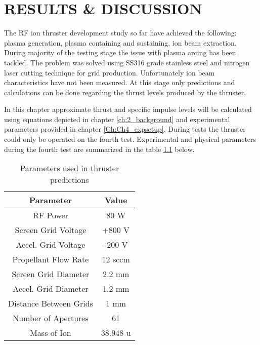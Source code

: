 \chapter{RESULTS \& DISCUSSION}\label{Ch5}

The RF ion thruster development study so far have achieved the following: plasma generation, plasma containing and sustaining, ion beam extraction. During majority of the testing stage the issue with plasma arcing has been tackled. The problem was solved using SS316 grade stainless steel and nitrogen laser cutting technique for grid production. Unfortunately ion beam characteristics have not been measured. At this stage only predictions and calculations can be done regarding the thrust levels produced by the thruster. 

In this chapter approximate thrust and specific impulse levels will be calculated using equations depicted in chapter \ref{ch:2_background} and experimental parameters provided in chapter \ref{Ch:Ch4_expsetup}. During tests the thruster could only be operated on the fourth test. Experimental and physical parameters during the fourth test are summarized in the table \ref{table:predictionparams} below.

\begin{table}[ht]
    \centering
    \begin{tabular}{||c|c||}
        \hline
        \textbf{Parameter} & \textbf{Value} \\
        \hline
        RF Power & 80 W \\
        \hline
        Screen Grid Voltage & +800 V \\
        \hline
        Accel. Grid Voltage & -200 V \\
        \hline 
        Propellant Flow Rate & 12 sccm \\
        \hline
        Screen Grid Diameter & 2.2 mm \\
        \hline
        Accel. Grid Diameter & 1.2 mm \\
        \hline
        Distance Between Grids & 1 mm \\
        \hline
        Number of Apertures & 61 \\
        \hline
        Mass of Ion & 38.948 u \\
        \hline
    \end{tabular}
    \caption{Parameters used in thruster predictions}
    \label{table:predictionparams}
\end{table}
\newpage
